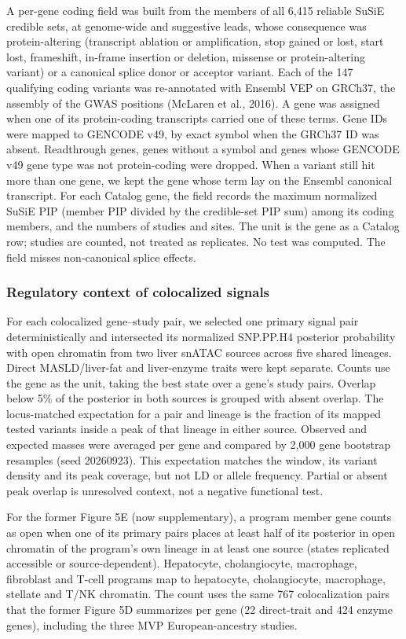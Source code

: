 A per-gene coding field was built from the members of all 6,415 reliable SuSiE credible sets, at genome-wide and suggestive leads, whose consequence was protein-altering (transcript ablation or amplification, stop gained or lost, start lost, frameshift, in-frame insertion or deletion, missense or protein-altering variant) or a canonical splice donor or acceptor variant. Each of the 147 qualifying coding variants was re-annotated with Ensembl VEP on GRCh37, the assembly of the GWAS positions (McLaren et al., 2016). A gene was assigned when one of its protein-coding transcripts carried one of these terms. Gene IDs were mapped to GENCODE v49, by exact symbol when the GRCh37 ID was absent. Readthrough genes, genes without a symbol and genes whose GENCODE v49 gene type was not protein-coding were dropped. When a variant still hit more than one gene, we kept the gene whose term lay on the Ensembl canonical transcript. For each Catalog gene, the field records the maximum normalized SuSiE PIP (member PIP divided by the credible-set PIP sum) among its coding members, and the numbers of studies and sites. The unit is the gene as a Catalog row; studies are counted, not treated as replicates. No test was computed. The field misses non-canonical splice effects.

\subsubsection{Regulatory context of colocalized signals}\label{regulatory-context-of-colocalized-signals}

For each colocalized gene--study pair, we selected one primary signal pair deterministically and intersected its normalized SNP.PP.H4 posterior probability with open chromatin from two liver snATAC sources across five shared lineages. Direct MASLD/liver-fat and liver-enzyme traits were kept separate. Counts use the gene as the unit, taking the best state over a gene's study pairs. Overlap below 5\% of the posterior in both sources is grouped with absent overlap. The locus-matched expectation for a pair and lineage is the fraction of its mapped tested variants inside a peak of that lineage in either source. Observed and expected masses were averaged per gene and compared by 2,000 gene bootstrap resamples (seed 20260923). This expectation matches the window, its variant density and its peak coverage, but not LD or allele frequency. Partial or absent peak overlap is unresolved context, not a negative functional test.

For the former Figure 5E (now supplementary), a program member gene counts as open when one of its primary pairs places at least half of its posterior in open chromatin of the program's own lineage in at least one source (states replicated accessible or source-dependent). Hepatocyte, cholangiocyte, macrophage, fibroblast and T-cell programs map to hepatocyte, cholangiocyte, macrophage, stellate and T/NK chromatin. The count uses the same 767 colocalization pairs that the former Figure 5D summarizes per gene (22 direct-trait and 424 enzyme genes), including the three MVP European-ancestry studies.

